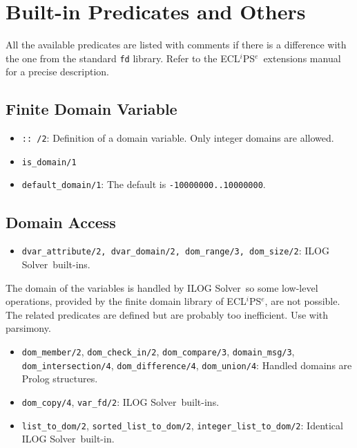 \documentclass{article}
\newcommand{\solver}{ILOG Solver}
\newcommand{\eclipse}{ECL$^i$PS$^e$}
\begin{document}
\section{Built-in Predicates and Others}

All the available predicates are listed with comments if there is a difference
with the one from the standard \verb"fd" library. Refer to the \eclipse\
extensions manual for a precise description.

\subsection{Finite Domain Variable}
\begin{itemize}
 \item\verb":: /2": Definition of a domain variable. Only integer domains are allowed.
 \item \verb"is_domain/1"
 \item \verb"default_domain/1": The default is \verb"-10000000..10000000".

\end{itemize}

\subsection{Domain Access}

\begin{itemize}
 \item \verb"dvar_attribute/2, dvar_domain/2, dom_range/3, dom_size/2": \solver\ built-ins.
\end{itemize}

The domain of the variables is handled by \solver\ so some low-level
operations, provided by the finite domain library of \eclipse, are not
possible. The related predicates are defined but are probably too inefficient.
Use with parsimony.

\begin{itemize}
 \item \verb"dom_member/2", \verb"dom_check_in/2", \verb"dom_compare/3",
  \verb"domain_msg/3", \verb"dom_intersection/4", \verb"dom_difference/4",
  \verb"dom_union/4": Handled domains are Prolog structures. 

 \item \verb"dom_copy/4", \verb"var_fd/2": \solver\ built-ins.
      
 \item \verb"list_to_dom/2", \verb"sorted_list_to_dom/2", \verb"integer_list_to_dom/2": Identical
 \solver\ built-in.
\end{itemize}
\end{document}
